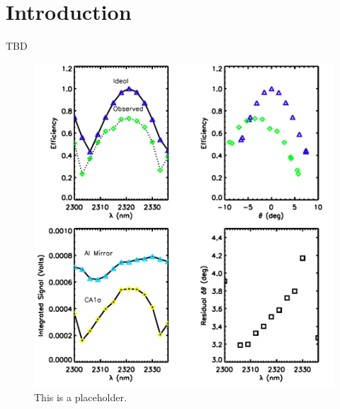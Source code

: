 \chapter{Introduction}

TBD

\begin{figure}
\begin{center}
    \includegraphics[width=\textwidth]{ch1/figs/test1}
  \end{center}
  \caption[Test fig]{This is a placeholder.}
\end{figure}

